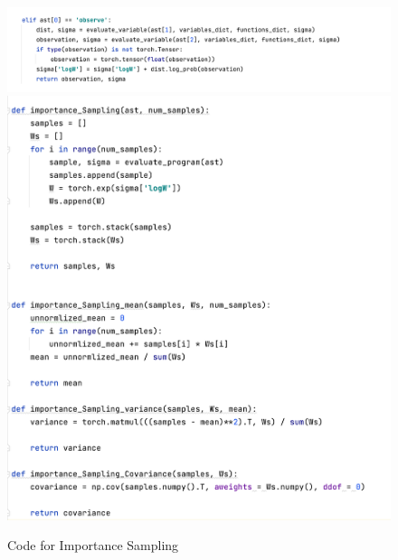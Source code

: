 \documentclass{article}
\begin{document}
\begin{enumerate}
\begin{figure}[!ht]
	\centering
	\includegraphics[scale=0.6]{../figs/IS_1}
	\includegraphics[scale=0.6]{../figs/IS_2}
	\caption{Code for Importance Sampling}
\end{figure}


\end{enumerate}
\end{document}
